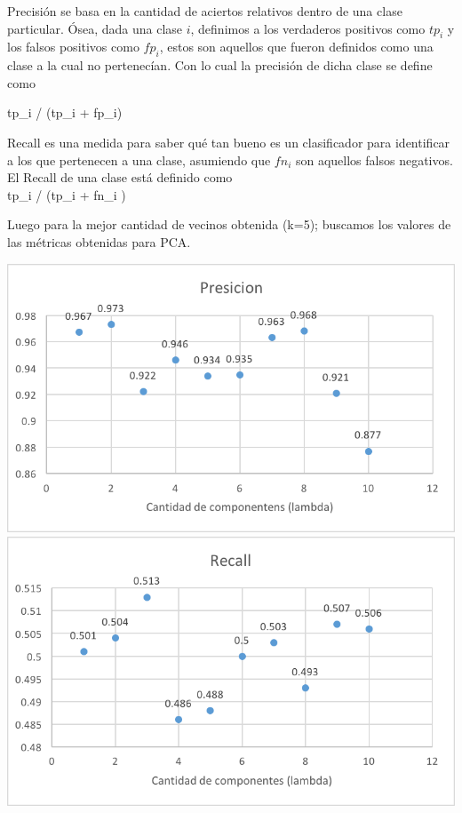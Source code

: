 Precisión se basa en la cantidad de aciertos relativos dentro de una clase particular. Ósea, dada una clase $i$, definimos a los verdaderos positivos como $tp_i$ y los falsos positivos como $fp_i$, estos son aquellos que fueron definidos como una clase a la cual no pertenecían.
Con lo cual la precisión de dicha clase se define como 

tp_i / (tp_i + fp_i)

Recall es una medida para saber qué tan bueno es un clasificador para identificar a los que pertenecen a una clase, asumiendo que $fn_i$ son aquellos falsos negativos.
El Recall de una clase está definido como \\
tp_i / (tp_i + fn_i )

Luego para la mejor cantidad de vecinos obtenida (k=5); buscamos los valores de las métricas obtenidas para PCA.

\includegraphics[scale=1]{imagenes/pcaPresicion.png}\\
\includegraphics[scale=1]{imagenes/pcaRecall.png}

